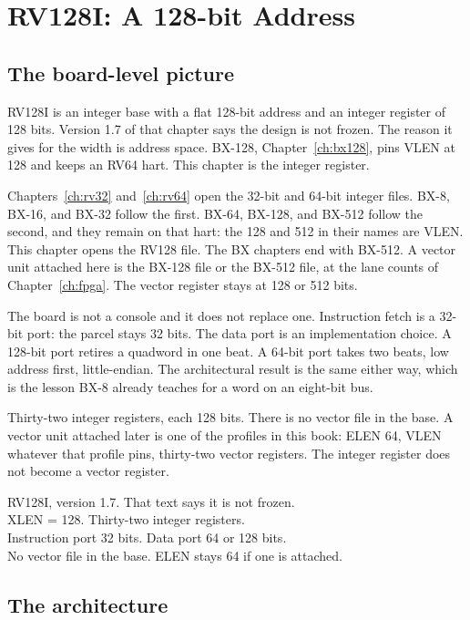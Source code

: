 \chapter{RV128I: A 128-bit Address}
\label{ch:rv128}

\section{The board-level picture}

RV128I is an integer base with a flat 128-bit address and an integer register of 128 bits. Version 1.7 of that chapter says the design is not frozen. The reason it gives for the width is address space. BX-128, Chapter~\ref{ch:bx128}, pins VLEN at 128 and keeps an RV64 hart. This chapter is the integer register.

Chapters~\ref{ch:rv32} and~\ref{ch:rv64} open the 32-bit and 64-bit integer files. BX-8, BX-16, and BX-32 follow the first. BX-64, BX-128, and BX-512 follow the second, and they remain on that hart: the 128 and 512 in their names are VLEN. This chapter opens the RV128 file. The BX chapters end with BX-512. A vector unit attached here is the BX-128 file or the BX-512 file, at the lane counts of Chapter~\ref{ch:fpga}. The vector register stays at 128 or 512 bits.

The board is not a console and it does not replace one. Instruction fetch is a 32-bit port: the parcel stays 32 bits. The data port is an implementation choice. A 128-bit port retires a quadword in one beat. A 64-bit port takes two beats, low address first, little-endian. The architectural result is the same either way, which is the lesson BX-8 already teaches for a word on an eight-bit bus.

Thirty-two integer registers, each 128 bits. There is no vector file in the base. A vector unit attached later is one of the profiles in this book: ELEN 64, VLEN whatever that profile pins, thirty-two vector registers. The integer register does not become a vector register.

\begin{spec}
RV128I, version 1.7. That text says it is not frozen.\\
XLEN = 128. Thirty-two integer registers.\\
Instruction port 32 bits. Data port 64 or 128 bits.\\
No vector file in the base. ELEN stays 64 if one is attached.
\end{spec}

\section{The architecture}

